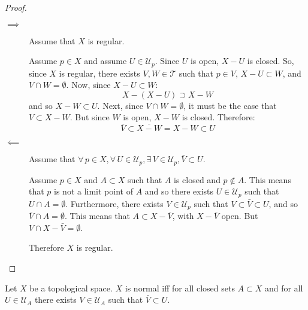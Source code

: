 \documentclass[letterpaper,12pt,fleqn]{article}
\newcommand{\T}{\mathscr{T}}
\newcommand{\U}{\mathcal{U}}
\begin{document}
\begin{proof}
  \begin{description}
  \item[]
  \item[\(\implies\)] Assume that \(X\) is regular.

    Assume \(p\in X\) and assume \(U\in\U_p\).  Since \(U\) is open, \(X-U\) is closed.  So, since \(X\) is
    regular, there exists \(V,W\in\T\) such that \(p\in V\), \(X-U\subset W\), and \(V\cap W=\emptyset\).
    Now, since \(X-U\subset W\):
    \[X-(X-U)\supset X-W\]
    and so \(X-W\subset U\).  Next, since \(V\cap W=\emptyset\), it must be the case that \(V\subset X-W\).  But
    since \(W\) is open, \(X-W\) is closed.  Therefore:
    \[\bar{V}\subset\overline{X-W}=X-W\subset U\]

  \item[\(\impliedby\)] Assume that \(\forall\,p\in X,\forall\,U\in\U_p,\exists\,V\in\U_p,\bar{V}\subset U\).

    Assume \(p\in X\) and \(A\subset X\) such that \(A\) is closed and \(p\notin A\).  This means that \(p\) is
    not a limit point of \(A\) and so there exists \(U\in\U_p\) such that \(U\cap A=\emptyset\).  Furthermore,
    there exists \(V\in\U_p\) such that \(V\subset\bar{V}\subset U\), and so \(\bar{V}\cap A=\emptyset\).  This
    means that \(A\subset X-\bar{V}\), with \(X-\bar{V}\) open.  But \(V\cap X-\bar{V}=\emptyset\).

    Therefore \(X\) is regular.
  \end{description}
\end{proof}

\begin{theorem}[4.9]
  Let \(X\) be a topological space.  \(X\) is normal iff for all closed sets \(A\subset X\) and for all
  \(U\in\U_A\) there exists \(V\in\U_A\) such that \(\bar{V}\subset U\).
\end{theorem}
\end{document}
